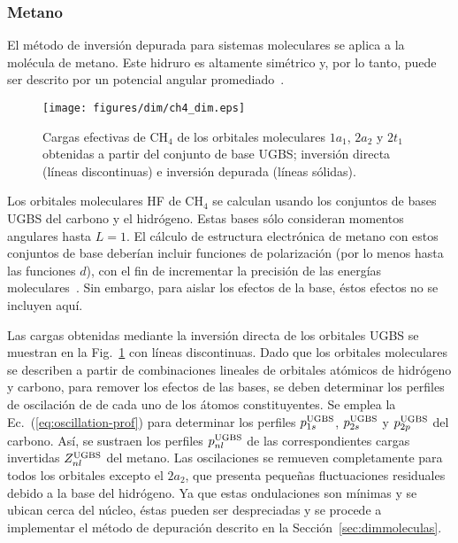 \subsubsection*{Metano}

El método de inversión depurada para sistemas moleculares se aplica a 
la molécula de metano. Este hidruro es altamente simétrico y, por lo 
tanto, puede ser descrito por un potencial angular 
promediado~\cite{Granados:16}. 

\begin{figure}[t]
\centering
\texttt{[image: figures/dim/ch4\_dim.eps]}
\caption[Cargas invertidas y depuradas de metano.]
{Cargas efectivas de CH$_4$ de los orbitales moleculares $1a_1$, $2a_2$ 
y $2t_1$ obtenidas a partir del conjunto de base UGBS; inversión directa 
(líneas discontinuas) e inversión depurada (líneas sólidas).}
\label{fig:ch4zeff}
\end{figure}

Los orbitales moleculares HF de CH$_4$ se calculan usando los conjuntos 
de bases UGBS del carbono y el hidrógeno. Estas bases sólo consideran 
momentos angulares hasta $L=1$. El cálculo de estructura electrónica de 
metano con estos conjuntos de base deberían incluir funciones de 
polarización (por lo menos hasta las funciones $d$), con el fin de 
incrementar la precisión de las energías moleculares~\cite{Rothenberg:71,
Hariharan:72}. Sin embargo, para aislar los efectos de la base, éstos 
efectos no se incluyen aquí. 

Las cargas obtenidas mediante la inversión directa de los orbitales UGBS 
se muestran en la Fig.~\ref{fig:ch4zeff} con líneas discontinuas. Dado 
que los orbitales moleculares se describen a partir de combinaciones 
lineales de orbitales atómicos de hidrógeno y carbono, para remover los 
efectos de las bases, se deben determinar los perfiles de oscilación de 
de cada uno de los átomos constituyentes. Se emplea la 
Ec.~(\ref{eq:oscillation-prof}) para determinar los perfiles 
$p_{1s}^{\mbox{\scriptsize UGBS}}$, $p_{2s}^{\mbox{\scriptsize UGBS}}$ y 
$p_{2p}^{\mbox{\scriptsize UGBS}}$ del carbono. Así, se sustraen los 
perfiles $p_{nl}^{\mbox{\scriptsize UGBS}}$ de las correspondientes 
cargas invertidas $Z_{nl}^{\mbox{\scriptsize UGBS}}$ del metano. Las 
oscilaciones se remueven completamente para todos los orbitales excepto 
el $2a_2$, que presenta pequeñas fluctuaciones residuales debido a la 
base del hidrógeno. Ya que estas ondulaciones son mínimas y se ubican 
cerca del núcleo, éstas pueden ser despreciadas y se procede a 
implementar el método de depuración descrito en la 
Sección~\ref{sec:dimmoleculas}. 

